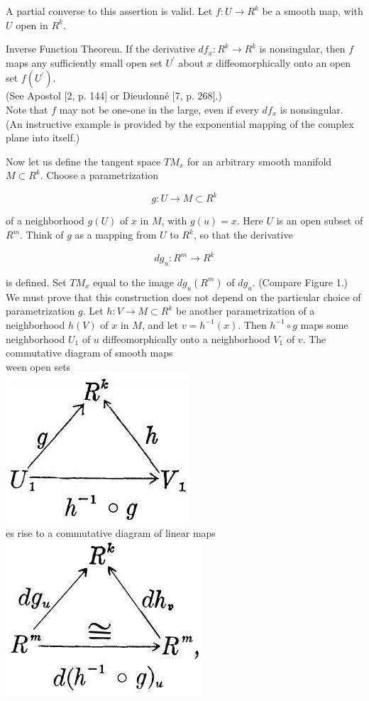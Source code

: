 \documentclass[10pt, letterpaper]{article}
\begin{document}
A partial converse to this assertion is valid. Let $f: U \rightarrow R^{k}$ be a smooth map, with $U$ open in $R^{k}$.

Inverse Function Theorem. If the derivative $d f_{x}: R^{k} \rightarrow R^{k}$ is nonsingular, then $f$ maps any sufficiently small open set $U^{\prime}$ about $x$ diffeomorphically onto an open set $f\left(U^{\prime}\right)$.\\[0pt]
(See Apostol [2, p. 144] or Dieudonné [7, p. 268].)\\
Note that $f$ may not be one-one in the large, even if every $d f_{x}$ is nonsingular. (An instructive example is provided by the exponential mapping of the complex plane into itself.)

Now let us define the tangent space $T M_{x}$ for an arbitrary smooth manifold $M \subset R^{k}$. Choose a parametrization

$$
g: U \rightarrow M \subset R^{k}
$$

of a neighborhood $g(U)$ of $x$ in $M$, with $g(u)=x$. Here $U$ is an open subset of $R^{m}$. Think of $g$ as a mapping from $U$ to $R^{k}$, so that the derivative

$$
d g_{u}: R^{m} \rightarrow R^{k}
$$

is defined. Set $T M_{x}$ equal to the image $d g_{u}\left(R^{m}\right)$ of $d g_{u}$. (Compare Figure 1.)\\
We must prove that this construction does not depend on the particular choice of parametrization $g$. Let $h: V \rightarrow M \subset R^{k}$ be another parametrization of a neighborhood $h(V)$ of $x$ in $M$, and let $v=h^{-1}(x)$. Then $h^{-1} \circ g$ maps some neighborhood $U_{1}$ of $u$ diffeomorphically onto a neighborhood $V_{1}$ of $v$. The commutative diagram of smooth maps\\
ween open sets\\
\includegraphics[scale=0.2, center]{2025_05_28_7c9927389b272ddbc2c3g-16(2)}\\
es rise to a commutative diagram of linear maps\\
\includegraphics[scale=0.2, center]{2025_05_28_7c9927389b272ddbc2c3g-16(1)}
\end{document}
